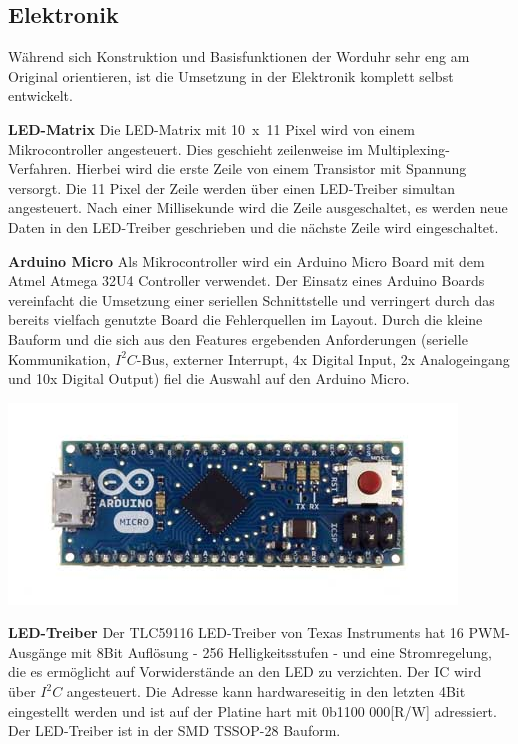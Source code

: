 \begin{multicols}{2}
\section{Elektronik}
\label{sec:Elektronik}
Während sich Konstruktion und Basisfunktionen der Worduhr sehr eng am Original orientieren, ist die Umsetzung in der Elektronik komplett selbst entwickelt.

\textbf{LED-Matrix} Die LED-Matrix mit 10~x~11 Pixel wird von einem Mikrocontroller angesteuert. Dies geschieht zeilenweise im Multiplexing-Verfahren. Hierbei wird die erste Zeile von einem Transistor mit Spannung versorgt. Die 11 Pixel der Zeile werden über einen LED-Treiber simultan angesteuert. Nach einer Millisekunde wird die Zeile ausgeschaltet, es werden neue Daten in den LED-Treiber geschrieben und die nächste Zeile wird eingeschaltet.

\textbf{Arduino Micro} Als Mikrocontroller wird ein Arduino Micro Board mit dem Atmel Atmega 32U4 Controller verwendet. Der Einsatz eines Arduino Boards vereinfacht die Umsetzung einer seriellen Schnittstelle und verringert durch das bereits vielfach genutzte Board die Fehlerquellen im Layout. Durch die kleine Bauform und die sich aus den Features ergebenden Anforderungen (serielle Kommunikation, $I^{2}C$-Bus, externer Interrupt, 4x Digital Input, 2x Analogeingang und 10x Digital Output) fiel die Auswahl auf den Arduino Micro.

\includegraphics[width=\columnwidth]{Abbildungen/Elektronik/ArduinoMicro}

\textbf{LED-Treiber} Der TLC59116 LED-Treiber von Texas Instruments hat 16 PWM-Ausgänge mit 8Bit Auflösung - 256 Helligkeitsstufen - und eine Stromregelung, die es ermöglicht auf Vorwiderstände an den LED zu verzichten. Der IC wird über $I^{2}C$ angesteuert. Die Adresse kann hardwareseitig in den letzten 4Bit eingestellt werden und ist auf der Platine hart mit 0b1100 000[R/W] adressiert. Der LED-Treiber ist in der SMD TSSOP-28 Bauform.



\end{multicols}
